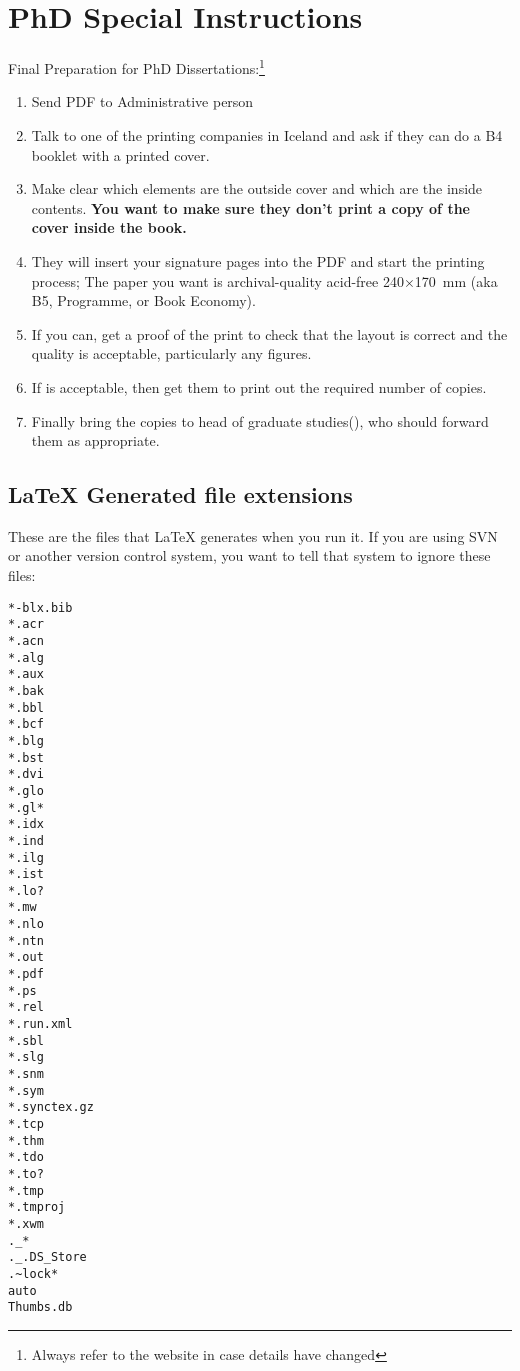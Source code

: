 \section{PhD Special Instructions}
Final Preparation for PhD Dissertations:\footnote{Always refer to the website in case details have changed}
\begin{enumerate}
\item Send PDF to Administrative person \TItvdadmin{}
\item Talk to one of the printing companies in Iceland and ask if they can do a B4 booklet with a printed cover.
\item Make clear which elements are the outside cover and which are the inside contents.
  \textbf{You want to make sure they don't print a copy of the cover inside the book.}
\item They will insert your signature pages into the PDF and start the printing process;
  The paper you want is archival-quality acid-free 240$\times$\SI{170}{\milli\meter} (aka B5, Programme, or Book Economy).
\item If you can, get a proof of the print to check that the layout is correct and the quality is acceptable, particularly any figures.
\item If is acceptable, then get them to print out the required number of copies.
\item Finally bring the copies to head of graduate studies(\TIheadofgrad{}), who should forward them as appropriate.
\end{enumerate}

\subsection{LaTeX Generated file extensions}\label{appendix:latex-gen}
These are the files that \LaTeX{} generates when you run it.
If you are using SVN or another version control system, you want to tell that system to ignore these files:
  \begin{verbatim}
*-blx.bib
*.acr
*.acn
*.alg
*.aux
*.bak
*.bbl
*.bcf
*.blg
*.bst
*.dvi
*.glo
*.gl*
*.idx
*.ind
*.ilg
*.ist
*.lo?
*.mw
*.nlo
*.ntn
*.out
*.pdf
*.ps
*.rel
*.run.xml
*.sbl
*.slg
*.snm
*.sym
*.synctex.gz
*.tcp
*.thm
*.tdo
*.to?
*.tmp
*.tmproj
*.xwm
._*
._.DS_Store
.~lock*
auto
Thumbs.db
\end{verbatim}
%

